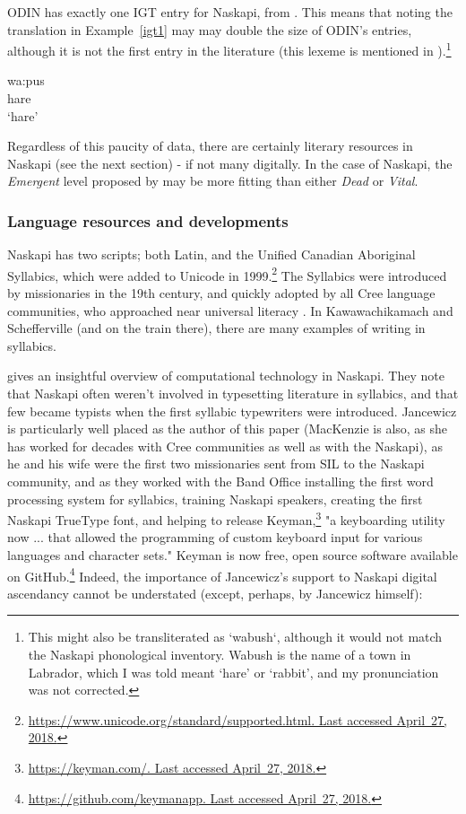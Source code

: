 ODIN has exactly one IGT entry for Naskapi, from \citep{richards2004syntax}. This means that noting the translation in Example~\ref{igt1} may may double the size of ODIN's entries, although it is not the first entry in the literature (this lexeme is mentioned in \citet{macKenzie1980towards}).\footnote{This might also be transliterated as `wabush`, although it would not match the Naskapi phonological inventory. Wabush is the name of a town in Labrador, which I was told meant `hare' or `rabbit', and my pronunciation was not corrected.} 

\begin{exe}
\ex
\gll wa:pus\\
hare\\
\trans `hare'
\label{igt1}
\end{exe}

Regardless of this paucity of data, there are certainly literary resources in Naskapi (see the next section) - if not many digitally. In the case of Naskapi, the {\it Emergent} level proposed by \citet{gibson2016assessing} may be more fitting than either {\it Dead} or {\it Vital}. 

\subsubsection{Language resources and developments}
Naskapi has two scripts; both Latin, and the Unified Canadian Aboriginal Syllabics, which were added to Unicode in 1999.\footnote{\href{https://www.unicode.org/standard/supported.html}{https://www.unicode.org/standard/supported.html. Last accessed April~27, 2018.}} The Syllabics were introduced by missionaries in the 19th century, and quickly adopted by all Cree language communities, who approached near universal literacy \citep{bennett1991cree}. In Kawawachikamach and Schefferville (and on the train there), there are many examples of writing in syllabics. 

\citet{jancewicz2002applied} gives an insightful overview of computational technology in Naskapi. They note that Naskapi often weren't involved in typesetting literature in syllabics, and that few became typists when the first syllabic typewriters were introduced. Jancewicz is particularly well placed as the author of this paper (MacKenzie is also, as she has worked for decades with Cree communities as well as with the Naskapi), as he and his wife were the first two missionaries sent from SIL to the Naskapi community, and as they worked with the Band Office installing the first word processing system for syllabics, training Naskapi speakers, creating the first Naskapi TrueType font, and helping to release Keyman,\footnote{\href{https://keyman.com/}{https://keyman.com/. Last accessed April~27, 2018.}} "a keyboarding utility now ... that allowed the programming of custom keyboard input for various languages and character sets." \citep[85]{jancewicz2002applied} Keyman is now free, open source software available on GitHub.\footnote{\href{https://github.com/keymanapp}{https://github.com/keymanapp. Last accessed April~27, 2018.}} Indeed, the importance of Jancewicz's support to Naskapi digital ascendancy cannot be understated (except, perhaps, by Jancewicz himself): 

